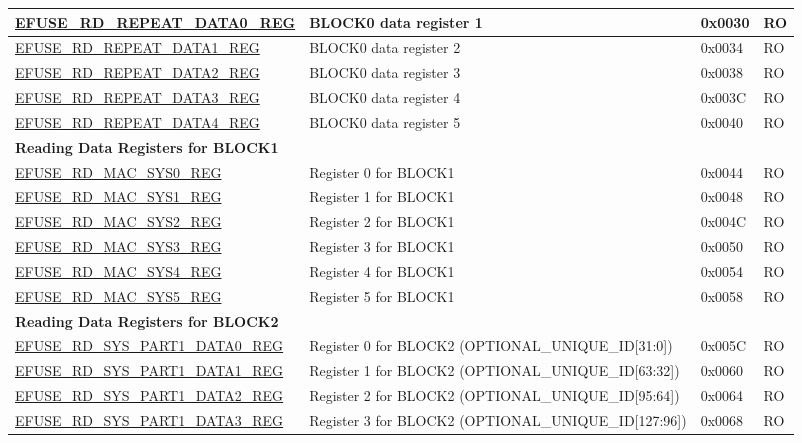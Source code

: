 \begin{longtable}{ | p{7.2cm} | p{6cm} | p{1.3cm} | p{1cm} | }
\hyperref[regdesc:EFUSERDREPEATDATA0REG]{EFUSE\_RD\_REPEAT\_DATA0\_REG} & BLOCK0 data register 1 & 0x0030 & RO \\ \hline
\hyperref[regdesc:EFUSERDREPEATDATA1REG]{EFUSE\_RD\_REPEAT\_DATA1\_REG} & BLOCK0 data register 2 & 0x0034 & RO \\ \hline
\hyperref[regdesc:EFUSERDREPEATDATA2REG]{EFUSE\_RD\_REPEAT\_DATA2\_REG} & BLOCK0 data register 3 & 0x0038 & RO \\ \hline
\hyperref[regdesc:EFUSERDREPEATDATA3REG]{EFUSE\_RD\_REPEAT\_DATA3\_REG} & BLOCK0 data register 4 & 0x003C & RO \\ \hline
\hyperref[regdesc:EFUSERDREPEATDATA4REG]{EFUSE\_RD\_REPEAT\_DATA4\_REG} & BLOCK0 data register 5 & 0x0040 & RO \\ \hline
\multicolumn{4}{|l|}{\textbf{Reading Data Registers for BLOCK1}} \\ \hline
\hyperref[regdesc:EFUSERDMACSYS0REG]{EFUSE\_RD\_MAC\_SYS0\_REG} & Register 0 for BLOCK1 & 0x0044 & RO \\ \hline
\hyperref[regdesc:EFUSERDMACSYS1REG]{EFUSE\_RD\_MAC\_SYS1\_REG} & Register 1 for BLOCK1 & 0x0048 & RO \\ \hline
\hyperref[regdesc:EFUSERDMACSYS2REG]{EFUSE\_RD\_MAC\_SYS2\_REG} & Register 2 for BLOCK1 & 0x004C & RO \\ \hline
\hyperref[regdesc:EFUSERDMACSYS3REG]{EFUSE\_RD\_MAC\_SYS3\_REG} & Register 3 for BLOCK1 & 0x0050 & RO \\ \hline
\hyperref[regdesc:EFUSERDMACSYS4REG]{EFUSE\_RD\_MAC\_SYS4\_REG} & Register 4 for BLOCK1 & 0x0054 & RO \\ \hline
\hyperref[regdesc:EFUSERDMACSYS5REG]{EFUSE\_RD\_MAC\_SYS5\_REG} & Register 5 for BLOCK1 & 0x0058 & RO \\ \hline
\multicolumn{4}{|l|}{\textbf{Reading Data Registers for BLOCK2}} \\ \hline
\hyperref[regdesc:EFUSERDSYSPART1DATA0REG]{EFUSE\_RD\_SYS\_PART1\_DATA0\_REG} & Register 0 for BLOCK2 (OPTIONAL\_UNIQUE\_ID[31:0]) & 0x005C & RO \\ \hline
\hyperref[regdesc:EFUSERDSYSPART1DATA1REG]{EFUSE\_RD\_SYS\_PART1\_DATA1\_REG} & Register 1 for BLOCK2 (OPTIONAL\_UNIQUE\_ID[63:32]) & 0x0060 & RO \\ \hline
\hyperref[regdesc:EFUSERDSYSPART1DATA2REG]{EFUSE\_RD\_SYS\_PART1\_DATA2\_REG} & Register 2 for BLOCK2 (OPTIONAL\_UNIQUE\_ID[95:64]) & 0x0064 & RO \\ \hline
\hyperref[regdesc:EFUSERDSYSPART1DATA3REG]{EFUSE\_RD\_SYS\_PART1\_DATA3\_REG} & Register 3 for BLOCK2 (OPTIONAL\_UNIQUE\_ID[127:96]) & 0x0068 & RO \\ \hline

\end{longtable}
